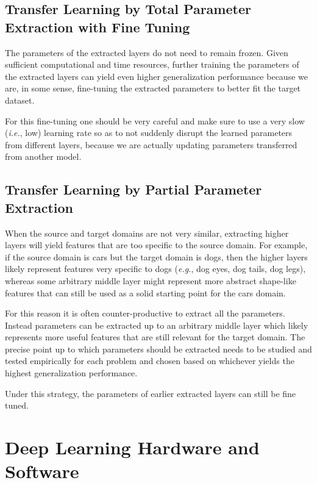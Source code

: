 \subsection{Transfer Learning by Total Parameter Extraction with Fine Tuning}

The parameters of the extracted layers do not need to remain frozen. Given sufficient computational and time resources, further training the parameters of the extracted layers can yield even higher generalization performance because we are, in some sense, fine-tuning the extracted parameters to better fit the target dataset.

For this fine-tuning one should be very careful and make sure to use a very slow (\textit{i.e.}, low) learning rate so as to not suddenly disrupt the learned parameters from different layers, because we are actually updating parameters transferred from another model.

\subsection{Transfer Learning by Partial Parameter Extraction}

When the source and target domains are not very similar, extracting higher layers will yield features that are too specific to the source domain. For example, if the source domain is cars but the target domain is dogs, then the higher layers likely represent features very specific to dogs (\textit{e.g.}, dog eyes, dog tails, dog legs), whereas some arbitrary middle layer might represent more abstract shape-like features that can still be used as a solid starting point for the cars domain.

For this reason it is often counter-productive to extract all the parameters. Instead parameters can be extracted up to an arbitrary middle layer which likely represents more useful features that are still relevant for the target domain. The precise point up to which parameters should be extracted needs to be studied and tested empirically for each problem and chosen based on whichever yields the highest generalization performance.

Under this strategy, the parameters of earlier extracted layers can still be fine tuned.

\section{Deep Learning Hardware and Software}

